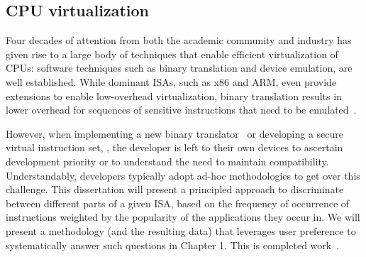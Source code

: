 \subsection{CPU virtualization}

Four decades of attention from both the academic community and industry has
given rise to a large body of techniques that enable efficient virtualization
of CPUs: software techniques such as binary translation and device emulation,
are well established. While dominant ISAs, such as x86 and ARM, even provide
extensions to enable low-overhead virtualization, binary translation results
in lower overhead for sequences of sensitive instructions that need to be
emulated~\cite{vmwareESX-paper}.

However, when implementing a new binary translator~\cite{HVX} or developing a
secure virtual instruction set, , the developer is left to
their own devices to ascertain development priority or to understand the need
to maintain compatibility. Understandably, developers typically adopt ad-hoc
methodologies to get over this challenge. This dissertation will present a
principled approach to discriminate between different parts of a given ISA,
based on the frequency of occurrence of instructions weighted by the
popularity of the applications they occur in. We will present a methodology (and the resulting data) that leverages user preference to systematically answer such questions in Chapter 1. This is completed work~\cite{x86-systor}.

